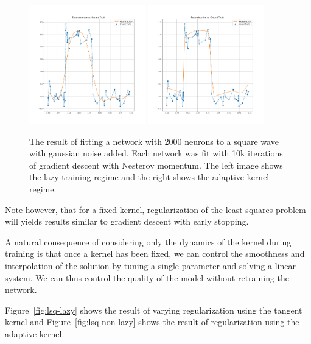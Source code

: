 \begin{figure}
    \centering
    \includegraphics[width=0.45\textwidth]{figures/lazy-square-noise.png}
    \includegraphics[width=0.45\textwidth]{figures/nonlazy-square-noise.png}
    \caption{The result of fitting a network with 2000 neurons to a square wave with gaussian noise added. Each network was fit with 10k iterations of gradient descent with Nesterov momentum. The left image shows the lazy training regime and the right shows the adaptive kernel regime.}
    \label{fig:early-stopping}
\end{figure}

Note however, that for a fixed kernel, regularization of the least squares problem will yields results similar to gradient descent with early stopping.

A natural consequence of considering only the dynamics of the kernel during training is that once a kernel has been fixed, we can control the smoothness and interpolation of the solution by tuning a single parameter and solving a linear system. We can thus control the quality of the model without retraining the network. 

Figure~\ref{fig:lsq-lazy} shows the result of varying regularization using the tangent kernel and Figure~\ref{fig:lsq-non-lazy} shows the result of regularization using the adaptive kernel.



